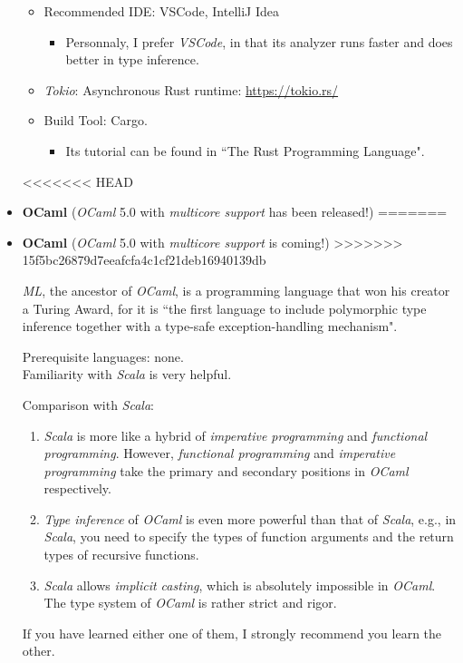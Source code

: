 \documentclass{article}
\begin{document}
\begin{itemize}
\begin{itemize}
        \item Recommended IDE: VSCode, IntelliJ Idea
        \begin{itemize}
            \item Personnaly, I prefer \emph{VSCode}, in that its analyzer runs faster and does better in type inference.
        \end{itemize}
        \item \emph{Tokio}: Asynchronous Rust runtime:
        \href{https://tokio.rs/}{https://tokio.rs/}
        \item Build Tool: Cargo.
        \begin{itemize}
            \item Its tutorial can be found in ``The Rust Programming Language".
        \end{itemize}
    \end{itemize}

<<<<<<< HEAD
    \item \textbf{OCaml} (\emph{OCaml} 5.0 with \emph{multicore support} has been released!)
=======
    \item \textbf{OCaml} (\emph{OCaml} 5.0 with \emph{multicore support} is coming!)
>>>>>>> 15f5bc26879d7eeafcfa4c1cf21deb16940139db
    
    \emph{ML}, the ancestor of \emph{OCaml}, is a programming language that won his creator a Turing Award, for it is ``the first language to include polymorphic type inference together with a type-safe exception-handling mechanism".
    
    Prerequisite languages: none.\\
    Familiarity with \emph{Scala} is very helpful.
    
    Comparison with \emph{Scala}:
    \begin{enumerate}
        \item \emph{Scala} is more like a hybrid of \emph{imperative programming} and \emph{functional programming}.
        However, \emph{functional programming} and \emph{imperative programming} take the primary and secondary positions in \emph{OCaml} respectively.
        
        \item \emph{Type inference} of \emph{OCaml} is even more powerful than that of \emph{Scala}, e.g., in \emph{Scala}, you need to specify the types of function arguments and the return types of recursive functions.
        
        \item \emph{Scala} allows \emph{implicit casting}, which is absolutely impossible in \emph{OCaml}.
        The type system of \emph{OCaml} is rather strict and rigor.
    \end{enumerate}
    If you have learned either one of them, I strongly recommend you learn the other.
    

\end{itemize}
\end{document}
